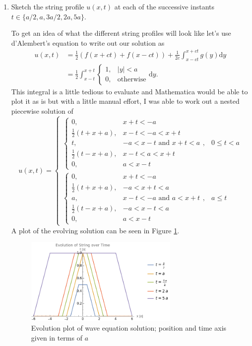 \documentclass[a4paper,12pt]{article}
\newcommand{\abs}[1]{\left| #1 \right|}
\newcommand{\dd}{\mathrm{d}}
\begin{document}
\begin{enumerate}[label = \arabic*.]
			\begin{enumerate}[label = (\alph*)]
				\item Sketch the string profile $ u(x,t) $ at each of the successive instants $ t \in \{a/2, a, 3a/2, 2a, 5a\} $.
				
				To get an idea of what the different string profiles will look like let's use d'Alembert's equation to write out our solution as
				\begin{align*}
					u(x,t) &= \frac{1}{2}(f(x + ct) + f(x - ct)) + \frac{1}{2c} \int_{x - ct}^{x + ct} g(y) \dd y \\
					&= \frac{1}{2}\int_{x - t}^{x + t} \begin{cases}
						1, & \abs{y} < a \\
						0, & \text{otherwise}
					\end{cases} \dd y.
				\end{align*}
				This integral is a little tedious to evaluate and Mathematica would be able to plot it as is but with a little manual effort, I was able to work out a nested piecewise solution of
				\[
					u(x,t) = 
						\begin{cases}
							\begin{cases}
								0, & x + t < -a \\
								\frac{1}{2}(t + x + a), & x - t < -a < x + t \\
								t, & -a < x - t \text{ and } x + t < a \\
								\frac{1}{2}(t - x + a), & x - t < a < x + t \\
								0, & a < x - t
							\end{cases}, & 0 \leq t < a \\
							\begin{cases}
								0, & x + t < -a \\
								\frac{1}{2}(t + x + a), & -a < x + t < a \\
								a, & x - t < -a \text{ and } a < x + t \\
								\frac{1}{2}(t - x + a), & -a < x - t < a \\
								0, & a < x - t
							\end{cases}, & a \leq t
						\end{cases}
				\]
				A plot of the evolving solution can be seen in Figure \ref{fig:string}.
				\begin{figure}[h!]
					\centering
					\captionsetup{width = 0.7\textwidth}
					\includegraphics[width = 0.7\textwidth]{images/string.png}
					\caption{Evolution plot of wave equation solution; position and time axis given in terms of $ a $}
					\label{fig:string}
				\end{figure}
				

\end{enumerate}
\end{enumerate}
\end{document}

